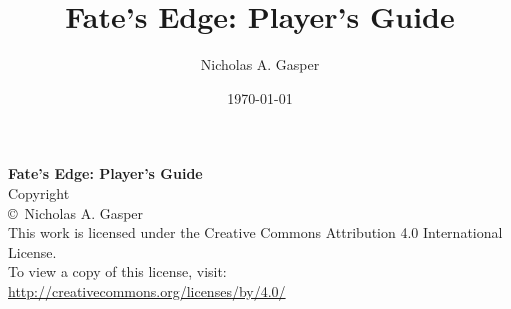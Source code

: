 \documentclass[12pt,oneside]{book}
\title{Fate's Edge: Player's Guide}
\author{Nicholas A. Gasper}
\date{\today}
\begin{document}
\frontmatter
\maketitle

\cleardoublepage
\thispagestyle{empty}
\begin{center}
  \vspace*{2in}
  \textbf{Fate's Edge: Player's Guide}\\[0.2in]
  Copyright \\
  \copyright\ Nicholas A. Gasper\\[0.2in]
  This work is licensed under the Creative Commons Attribution 4.0 International License.\\
  To view a copy of this license, visit:\\
  \url{http://creativecommons.org/licenses/by/4.0/}
\end{center}
\cleardoublepage

\tableofcontents

\mainmatter


















\backmatter
\printindex
\end{document}
